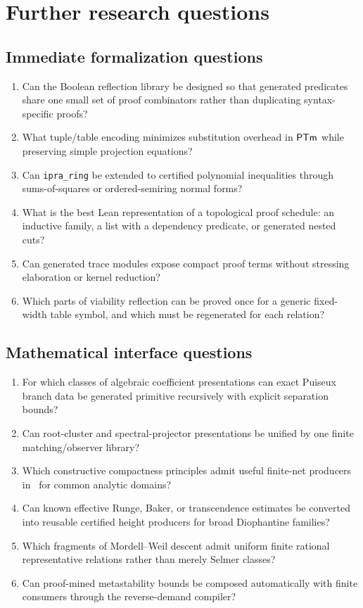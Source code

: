 \section{Further research questions}\label{sec:research}

\subsection{Immediate formalization questions}

\begin{enumerate}[label=\textbf{R\arabic*.}]
  \item Can the Boolean reflection library be designed so that generated predicates share one small set of proof combinators rather than duplicating syntax-specific proofs?
  \item What tuple/table encoding minimizes substitution overhead in \(\mathsf{PTm}\) while preserving simple projection equations?
  \item Can \texttt{ipra\_ring} be extended to certified polynomial inequalities through sums-of-squares or ordered-semiring normal forms?
  \item What is the best Lean representation of a topological proof schedule: an inductive family, a list with a dependency predicate, or generated nested cuts?
  \item Can generated trace modules expose compact proof terms without stressing elaboration or kernel reduction?
  \item Which parts of viability reflection can be proved once for a generic fixed-width table symbol, and which must be regenerated for each relation?
\end{enumerate}

\subsection{Mathematical interface questions}

\begin{enumerate}[label=\textbf{R\arabic*.},resume]
  \item For which classes of algebraic coefficient presentations can exact Puiseux branch data be generated primitive recursively with explicit separation bounds?
  \item Can root-cluster and spectral-projector presentations be unified by one finite matching/observer library?
  \item Which constructive compactness principles admit useful finite-net producers in \iPRA\ for common analytic domains?
  \item Can known effective Runge, Baker, or transcendence estimates be converted into reusable certified height producers for broad Diophantine families?
  \item Which fragments of Mordell--Weil descent admit uniform finite rational representative relations rather than merely Selmer classes?
  \item Can proof-mined metastability bounds be composed automatically with finite consumers through the reverse-demand compiler?
\end{enumerate}

